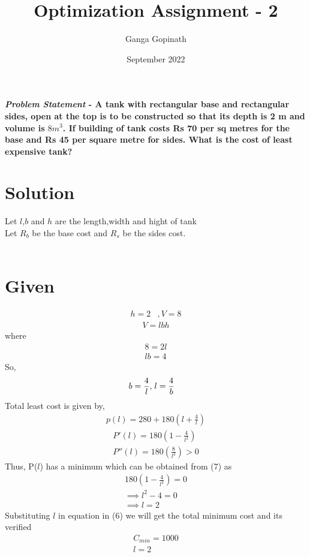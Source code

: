 \documentclass[journal,10pt,twocolumn]{article}
\title{\textbf{Optimization Assignment - 2}}
\author{Ganga Gopinath}
\date{September 2022}
\providecommand{\brak}[1]{\ensuremath{\left(#1\right)}}
\begin{document}
\maketitle
\paragraph{\textit{Problem Statement} - A tank with rectangular base and rectangular sides, open at the top is to be constructed so that its depth is 2 m and volume is $8 m^3$. If building of tank costs Rs 70 per sq metres for the base and Rs 45 per square metre for sides. What is the cost of least expensive tank?}

\section*{\large Solution}

Let $l$,$b$ and $h$ are the length,width and hight of tank \\
Let $R_b$ be the base cost and $R_s$ be the sides cost.\\\ \vspace{2mm}

\section*{\large Given}
\begin{align}
h=2 &, V=8
\end{align}
\begin{align}
	V = lbh
\end{align}
where
\begin{align}
	8=2l\\
	lb=4
\end{align}
So,
\begin{align}
	b=\frac{4}{l},\hspace{1mm} & l=\frac{4}{b}
\end{align}
Total least cost is given by,\\ \vspace{1mm}
\begin{align}
    p(l)=280+180\brak{l+\frac{4}{l}}
\end{align}
\begin{align}
	P'(l)=180\brak{1-\frac{4}{l^2}}\\
    P''(l)= 180\brak{\frac{8}{l^3}} > 0
\end{align}
Thus, P($l$) has a minimum which can be obtained from (7) as 
\begin{align}
    180\brak{1-\frac{4}{l^2}}=0\\
    \implies l^2-4=0\\
    \implies l=2
\end{align}
Substituting $l$ in equation in (6) we will get the total minimum cost and its verified 
\begin{align}
	\boxed{C_{min} = 1000}\\
	\boxed{l = 2}
\end{align}
\end{document}

